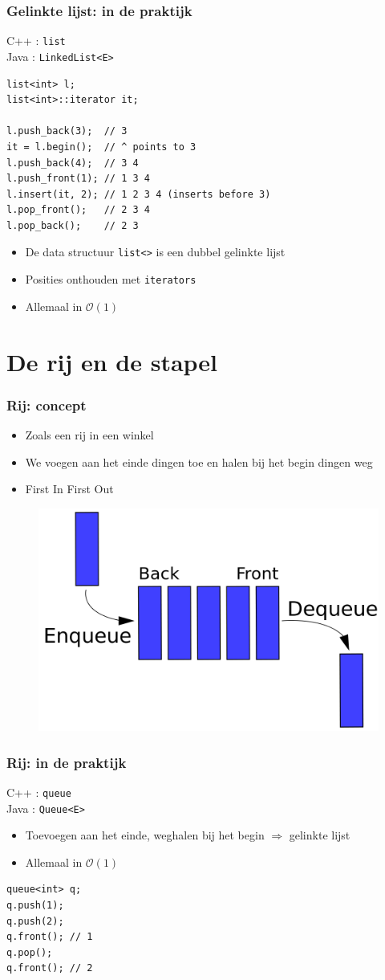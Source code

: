 \documentclass[12pt]{beamer}
\newcommand{\bigoh}[1]{\mathcal{O}\left(#1\right)}
\newcommand{\constant}{\bigoh{1}}
\begin{document}
\begin{frame}[fragile]
\frametitle{Gelinkte lijst: in de praktijk}
C++ : \texttt{list} \\
Java : \texttt{LinkedList<E>}
\begin{lstlisting}
list<int> l;
list<int>::iterator it;

l.push_back(3);  // 3
it = l.begin();  // ^ points to 3
l.push_back(4);  // 3 4
l.push_front(1); // 1 3 4
l.insert(it, 2); // 1 2 3 4 (inserts before 3)
l.pop_front();   // 2 3 4
l.pop_back();    // 2 3
\end{lstlisting}
\begin{itemize}
\item De data structuur \texttt{list<>} is een dubbel gelinkte lijst
\item Posities onthouden met \texttt{iterators}
\item Allemaal in $\constant$
\end{itemize}
\end{frame}

\section{De rij en de stapel}

\begin{frame}
\frametitle{Rij: concept}
\begin{itemize}
\item Zoals een rij in een winkel
\item We voegen aan het einde dingen toe en halen bij het begin dingen weg
\item First In First Out
\end{itemize}
\begin{figure}
\centering
\includegraphics[width=.6\textwidth]{img/queue}
\end{figure}
\end{frame}

\begin{frame}[fragile]
\frametitle{Rij: in de praktijk}
C++ : \texttt{queue} \\
Java : \texttt{Queue<E>}
\begin{itemize}
\item Toevoegen aan het einde, weghalen bij het begin $\Rightarrow$ gelinkte lijst
\item Allemaal in $\constant$
\end{itemize}
\begin{lstlisting}
queue<int> q;
q.push(1);
q.push(2);
q.front(); // 1
q.pop();
q.front(); // 2
\end{lstlisting}
\end{frame}
\end{document}

